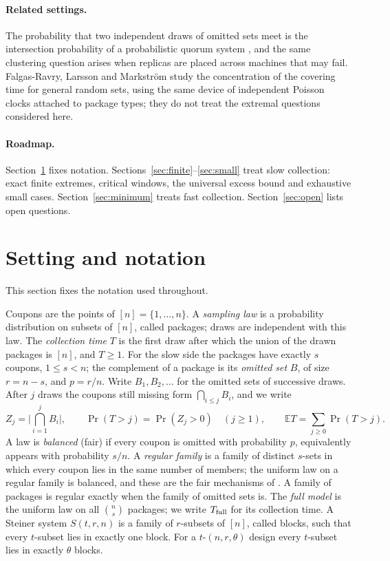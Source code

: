\documentclass[11pt,a4paper]{article}
\theoremstyle{remark}
\newcommand{\E}{\mathbb E}
\begin{document}
\paragraph{Related settings.} The probability that two independent draws of omitted sets meet is the intersection probability of a probabilistic quorum system \cite[Definition~3.1]{malkhi}, and the same clustering question arises when replicas are placed across machines that may fail. Falgas-Ravry, Larsson and Markstr\"om \cite{flm} study the concentration of the covering time for general random sets, using the same device of independent Poisson clocks attached to package types; they do not treat the extremal questions considered here.

\paragraph{Roadmap.} Section~\ref{sec:setting} fixes notation. Sections~\ref{sec:finite}--\ref{sec:small} treat slow collection: exact finite extremes, critical windows, the universal excess bound and exhaustive small cases. Section~\ref{sec:minimum} treats fast collection. Section~\ref{sec:open} lists open questions.

\section{Setting and notation}
\label{sec:setting}
This section fixes the notation used throughout.

Coupons are the points of $[n]=\{1,\dots,n\}$. A \emph{sampling law} is a probability distribution on subsets of $[n]$, called packages; draws are independent with this law. The \emph{collection time} $T$ is the first draw after which the union of the drawn packages is $[n]$, and $T\ge1$. For the slow side the packages have exactly $s$ coupons, $1\le s<n$; the complement of a package is its \emph{omitted set} $B$, of size $r=n-s$, and $p=r/n$. Write $B_1,B_2,\dots$ for the omitted sets of successive draws. After $j$ draws the coupons still missing form $\bigcap_{i\le j}B_i$, and we write
\[
 Z_j=\Big|\bigcap_{i=1}^j B_i\Big|,\qquad \Pr(T>j)=\Pr(Z_j>0)\quad(j\ge1),\qquad \E T=\sum_{j\ge0}\Pr(T>j).
\]
A law is \emph{balanced} (fair) if every coupon is omitted with probability $p$, equivalently appears with probability $s/n$. A \emph{regular family} is a family of distinct $s$-sets in which every coupon lies in the same number of members; the uniform law on a regular family is balanced, and these are the fair mechanisms of \cite{gy,barak}. A family of packages is regular exactly when the family of omitted sets is. The \emph{full model} is the uniform law on all $\binom ns$ packages; we write $T_{\rm full}$ for its collection time. A Steiner system $S(t,r,n)$ is a family of $r$-subsets of $[n]$, called blocks, such that every $t$-subset lies in exactly one block. For a $t$-$(n,r,\theta)$ design every $t$-subset lies in exactly $\theta$ blocks.
\end{document}
